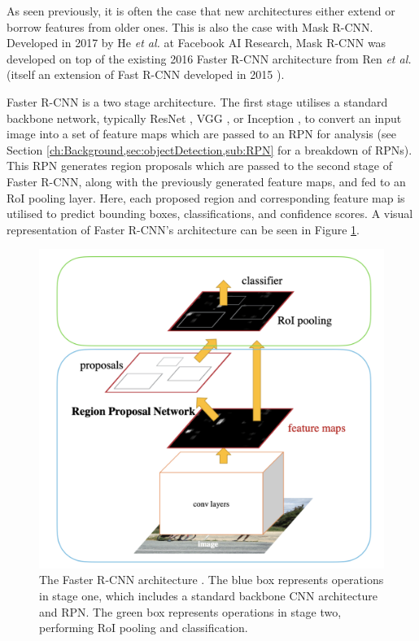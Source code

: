As seen previously, it is often the case that new architectures either extend or borrow features from older ones. This is also the case with Mask R-CNN. Developed in 2017 by He \textit{et al.} at Facebook AI Research, Mask R-CNN was developed on top of the existing 2016 Faster R-CNN architecture from Ren \textit{et al.} \cite{ren_faster_2015} (itself an extension of Fast R-CNN developed in 2015 \cite{girshick_fast_2015}). 

Faster R-CNN is a two stage architecture. The first stage utilises a standard backbone network, typically ResNet \cite{he_deep_2015}, VGG \cite{simonyan_very_2015}, or Inception \cite{szegedy_going_2015}, to convert an input image into a set of feature maps which are passed to an RPN for analysis (see Section \ref{ch:Background,sec:objectDetection,sub:RPN} for a breakdown of RPNs). This RPN generates region proposals which are passed to the second stage of Faster R-CNN, along with the previously generated feature maps, and fed to an RoI pooling layer.  Here, each proposed region and corresponding feature map is utilised to predict bounding boxes, classifications, and confidence scores. A visual representation of Faster R-CNN's architecture can be seen in Figure \ref{fig:faster-r-cnn-architecture}.


\begin{figure}
	\begin{center}
		\includegraphics[scale=0.3]{Chapter2/figs/faster-r-cnn-architecture.png}
	\end{center}
	\caption{The Faster R-CNN architecture \cite{ren_faster_2015}. The blue box represents operations in stage one, which includes a standard backbone CNN architecture and RPN. The green box represents operations in stage two, performing RoI pooling and classification.}
	\label{fig:faster-r-cnn-architecture}
\end{figure}

